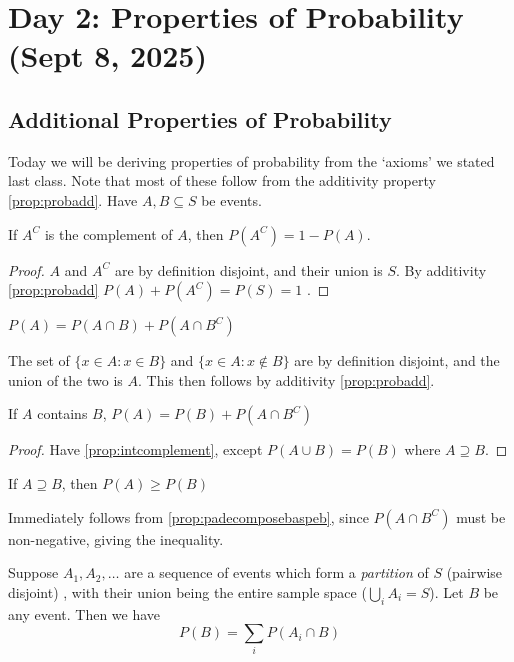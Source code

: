 \section{Day 2: Properties of Probability (Sept 8, 2025)}

\subsection{Additional Properties of Probability}
Today we will be deriving properties of probability from the `axioms' we stated last class. Note that most of these follow from the additivity property \ref{prop:probadd}. Have $A, B \subseteq S$ be events.
\begin{simplethm}
    If $A^C$ is the complement of $A$, then $P(A^C) = 1 - P(A)$. \label{prop:pcomplement}
\end{simplethm}
\begin{proof}
    $A$ and $A^C$ are by definition disjoint, and their union is $S$. By additivity \ref{prop:probadd} $P(A) + P(A^C) = P(S) = 1$ .
\end{proof}
\begin{simplethm}
    $P(A) = P(A \cap B) + P(A \cap B^C)$ \label{prop:intcomplement} 
\end{simplethm}
The set of $\{ x \in A : x \in B \}$ and $\{ x \in A : x \not \in B \}$ are by definition disjoint, and the union of the two is $A$. This then follows by additivity \ref{prop:probadd}.
\begin{simplethm}
    If $A$ contains $B$, $P(A) = P(B) + P(A \cap B^C)$ \label{prop:padecomposebaspeb}
\end{simplethm}
\begin{proof}
    Have \ref{prop:intcomplement}, except $P(A \cup B) = P(B)$ where $A \supseteq B$.
\end{proof}
\begin{simplethm}[Monotonicity]
    If $A \supseteq B$, then $P(A) \geq P(B)$
\end{simplethm}
Immediately follows from \ref{prop:padecomposebaspeb}, since $P(A \cap B^C)$ must be non-negative, giving the inequality. 

\begin{theorem} \label{thm:lawoftotalprob}
    Suppose $A_1, A_2, \dots$ are a sequence of events which form a \textit{partition} of $S$ (pairwise disjoint) , with their union being the entire sample space ($\bigcup_i A_i = S$). Let $B$ be any event. Then we have
    \[
    P(B) = \sum_i P(A_i \cap B)
    \]
\end{theorem}

